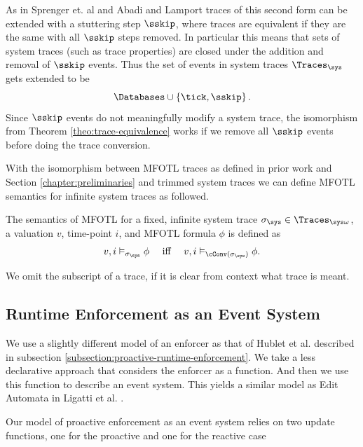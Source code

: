 As in Sprenger et. al \cite{igloo} and Abadi and Lamport \cite{refinement-mappings}
traces of this second form can be extended with a stuttering step
$\sskip$, where traces are equivalent if they are the same with all
$\sskip$ steps removed.
In particular this means that sets of system traces (such as trace properties)
are closed under the addition and removal of $\sskip$ events.
Thus the set of events in system traces $\Traces_\sys$
gets extended to be
$$
    \Databases \cup \left\{ \tick, \sskip \right\}.
$$
Since $\sskip$ events do not meaningfully modify a system trace,
the isomorphism from Theorem \ref{theo:trace-equivalence} works if
we remove all $\sskip$ events before doing the trace conversion.

With the isomorphism between MFOTL traces as defined in prior work and
Section \ref{chapter:preliminaries} and trimmed system traces we can
define MFOTL semantics for infinite system traces as followed.

\begin{definition}
    \label{def:mfotl-semantics-for-system-traces}
    The semantics of MFOTL for a fixed, infinite system trace
    $\sigma_\sys \in \Traces_{\sys \omega}$, a valuation $v$,
    time-point $i$, and MFOTL formula $\phi$ is defined as
    \begin{equation*}
        v, i \vDash_{\sigma_\sys} \phi \quad \text{ iff } \quad
        v, i \vDash_{\cConv(\sigma_\sys)} \phi.
    \end{equation*}
\end{definition}
We omit the subscript of a trace, if it is clear from context
what trace is meant.

\subsection{Runtime Enforcement as an Event System}
\label{subsection:runtime-enforcement-event-system}


We use a slightly different model of an enforcer as that of
Hublet et al. \cite{whyenf} described in subsection
\ref{subsection:proactive-runtime-enforcement}.
We take a less declarative approach that considers the enforcer as 
a function. And then we use this function to describe an event system.
This yields a similar model as Edit Automata in Ligatti et al.
\cite{edit-automata}.

Our model of proactive enforcement as an event system relies on two 
update functions, one for the proactive and one for the reactive case

